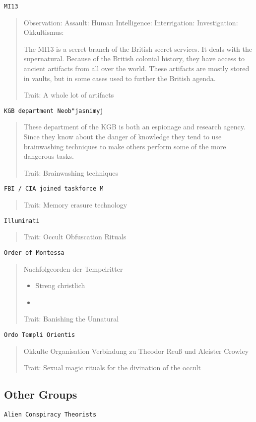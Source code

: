 \documentclass[11pt]{article}
\begin{document}
{\texttt{MI13}
\begin{quote}
Observation: 
Assault: 
Human Intelligence: 
Interrigation: 
Investigation:
Okkultismus: 

The MI13 is a secret branch of the British secret services. It deals with the supernatural. Because of the British colonial history, they have access to ancient artifacts from all over the world. These artifacts are mostly stored in vaults, but in some cases used to further the British agenda.

Trait: A whole lot of artifacts
\end{quote}


\texttt{KGB department Neob"jasnimyj}
\begin{quote}
These department of the KGB is both an espionage and research agency. Since they know about the danger of knowledge they tend to use brainwashing techniques to make others perform some of the more dangerous tasks.

Trait: Brainwashing techniques 
\end{quote}

\texttt{FBI / CIA joined taskforce M} 
\begin{quote}
Trait: Memory erasure technology
\end{quote}

\texttt{Illuminati}
\begin{quote}
Trait: Occult Obfuscation Rituals
\end{quote}

\texttt{Order of Montessa}
\begin{quote}
Nachfolgeorden der Tempelritter
\begin{itemize}
\item Streng christlich
\item 
\end{itemize}

Trait: Banishing the Unnatural
\end{quote}

\texttt{Ordo Templi Orientis}
\begin{quote}
Okkulte Organisation
Verbindung zu Theodor Reuß und Aleister Crowley

Trait: Sexual magic rituals for the divination of the occult
\end{quote}

\subsection{Other Groups}
\label{sec:org3267f9a}
\texttt{Alien Conspiracy Theorists}

}
\end{document}
